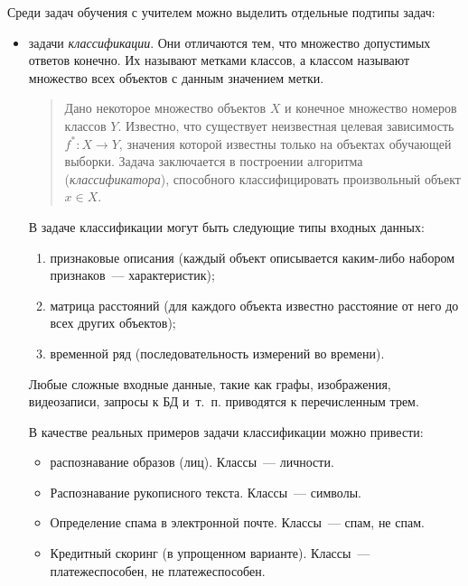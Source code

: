 Среди задач обучения с учителем можно выделить отдельные подтипы задач:
\begin{itemize}
  \vspace*{-1ex}
  \itemsep -5pt
  \item задачи \emph{классификации}. Они отличаются тем, что множество допустимых ответов конечно. Их
    называют метками классов, а классом называют множество всех объектов с данным значением метки.
    
    \begin{quote}
      \vspace*{-1ex}
      Дано некоторое множество объектов \( X \) и конечное множество номеров классов \( Y \). Известно,
      что существует неизвестная целевая зависимость \( f^*\colon X\to Y \), значения которой известны
      только на объектах обучающей выборки. Задача заключается в построении алгоритма
      (\emph{классификатора}), способного классифицировать произвольный объект \( x\in X \).
      \vspace*{-1ex}
    \end{quote}
        
    В задаче классификации могут быть следующие типы входных данных:
    \begin{enumerate}
       \item признаковые описания (каждый объект описывается каким-либо набором признаков~---
         характеристик);
       \item матрица расстояний (для каждого объекта известно расстояние от него до всех других
         объектов);
       \item временной ряд (последовательность измерений во времени).
    \end{enumerate}

    Любые сложные входные данные, такие как графы, изображения, видеозаписи, запросы к БД и~т.~п.
    приводятся к перечисленным трем.

    В качестве реальных примеров задачи классификации можно привести:
    \begin{itemize}
      \item распознавание образов (лиц). Классы~--- личности.
      \item Распознавание рукописного текста. Классы~--- символы.
      \item Определение спама в электронной почте. Классы~--- спам, не спам.
      \item Кредитный скоринг (в упрощенном варианте). Классы~--- платежеспособен, не платежеспособен.
    \end{itemize}
   

\end{itemize}
